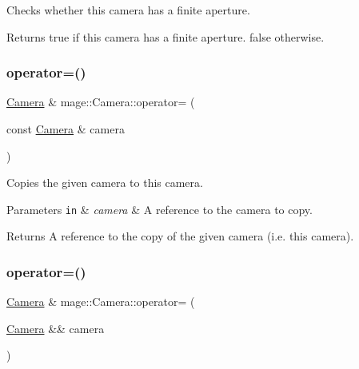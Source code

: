 Checks whether this camera has a finite aperture.

\begin{DoxyReturn}{Returns}
{\ttfamily true} if this camera has a finite aperture. {\ttfamily false} otherwise. 
\end{DoxyReturn}
\hypertarget{classmage_1_1_camera_a9ae561f9cc0ed0dd855ee1d824dad090}{}\label{classmage_1_1_camera_a9ae561f9cc0ed0dd855ee1d824dad090} 
\subsubsection{\texorpdfstring{operator=()}{operator=()}\hspace{0.1cm}{\footnotesize\ttfamily [1/2]}}
{\footnotesize\ttfamily \hyperlink{classmage_1_1_camera}{Camera} \& mage\+::\+Camera\+::operator= (\begin{DoxyParamCaption}\item[{const \hyperlink{classmage_1_1_camera}{Camera} \&}]{camera }\end{DoxyParamCaption})\hspace{0.3cm}{\ttfamily [default]}}

Copies the given camera to this camera.


\begin{DoxyParams}[1]{Parameters}
\mbox{\tt in}  & {\em camera} & A reference to the camera to copy. \\
\hline
\end{DoxyParams}
\begin{DoxyReturn}{Returns}
A reference to the copy of the given camera (i.\+e. this camera). 
\end{DoxyReturn}
\hypertarget{classmage_1_1_camera_a83e33f57394e85eee58745eb8e05b282}{}\label{classmage_1_1_camera_a83e33f57394e85eee58745eb8e05b282} 
\subsubsection{\texorpdfstring{operator=()}{operator=()}\hspace{0.1cm}{\footnotesize\ttfamily [2/2]}}
{\footnotesize\ttfamily \hyperlink{classmage_1_1_camera}{Camera} \& mage\+::\+Camera\+::operator= (\begin{DoxyParamCaption}\item[{\hyperlink{classmage_1_1_camera}{Camera} \&\&}]{camera }\end{DoxyParamCaption})\hspace{0.3cm}{\ttfamily [default]}}

